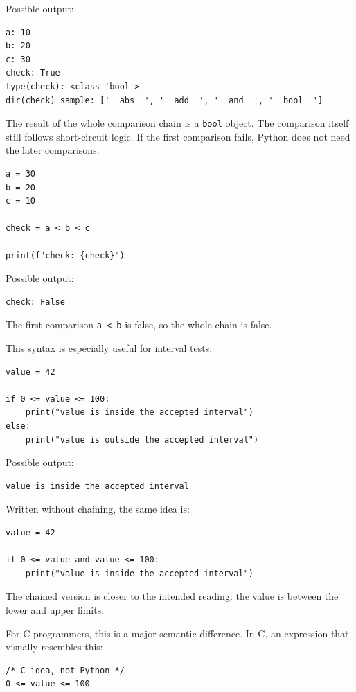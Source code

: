 \documentclass[a4paper,twoside]{report}
\begin{document}
Possible output:

\begin{verbatim}
a: 10
b: 20
c: 30
check: True
type(check): <class 'bool'>
dir(check) sample: ['__abs__', '__add__', '__and__', '__bool__']
\end{verbatim}

The result of the whole comparison chain is a \texttt{bool} object. The comparison itself still follows short-circuit logic. If the first comparison fails, Python does not need the later comparisons.

\begin{verbatim}
a = 30
b = 20
c = 10

check = a < b < c

print(f"check: {check}")
\end{verbatim}

Possible output:

\begin{verbatim}
check: False
\end{verbatim}

The first comparison \texttt{a < b} is false, so the whole chain is false.

This syntax is especially useful for interval tests:

\begin{verbatim}
value = 42

if 0 <= value <= 100:
    print("value is inside the accepted interval")
else:
    print("value is outside the accepted interval")
\end{verbatim}

Possible output:

\begin{verbatim}
value is inside the accepted interval
\end{verbatim}

Written without chaining, the same idea is:

\begin{verbatim}
value = 42

if 0 <= value and value <= 100:
    print("value is inside the accepted interval")
\end{verbatim}

The chained version is closer to the intended reading: the value is between the lower and upper limits.

For C programmers, this is a major semantic difference. In C, an expression that visually resembles this:

\begin{verbatim}
/* C idea, not Python */
0 <= value <= 100
\end{verbatim}
\end{document}

